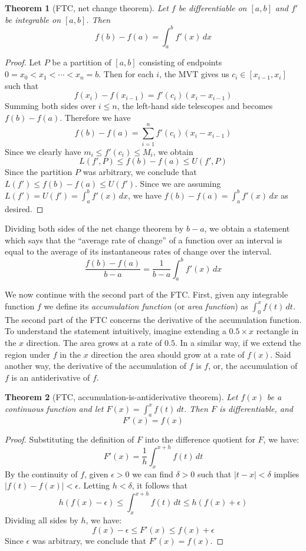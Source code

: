 \documentclass[11pt,oneside]{amsbook}
\theoremstyle{definition}
\theoremstyle{plain}
\newtheorem{theorem}{Theorem}[section]
\theoremstyle{definition}
\theoremstyle{remark}
\numberwithin{equation}{section}
\numberwithin{figure}{section}
\begin{document}
\begin{theorem}[FTC, net change theorem]
  Let $f$ be differentiable on $[a,b]$ and $f'$ be integrable on $[a,b]$. Then
  \[f(b)-f(a)=\int_a^b f'(x)\,dx
  \]
\end{theorem}

\begin{proof}
  Let $P$ be a partition of $[a,b]$ consisting of endpoints $0=x_0<x_1<\cdots<x_n=b$. Then for each $i$, the MVT gives us $c_i\in[x_{i-1},x_i]$ such that
  \[f(x_i)-f(x_{i-1})=f'(c_i)(x_i-x_{i-1})
  \]
  Summing both sides over $i\leq n$, the left-hand side telescopes and becomes $f(b)-f(a)$. Therefore we have
  \[f(b)-f(a)=\sum_{i=1}^n f'(c_i)(x_i-x_{i-1})
  \]
  Since we clearly have $m_i\leq f'(c_i)\leq M_i$, we obtain
  \[L(f',P)\leq f(b)-f(a)\leq U(f',P)
  \]
  Since the partition $P$ was arbitrary, we conclude that $L(f')\leq f(b)-f(a)\leq U(f')$. Since we are assuming $L(f')=U(f')=\int_a^bf'(x)\,dx$, we have $f(b)-f(a)=\int_a^bf'(x)\,dx$ as desired.
\end{proof}

Dividing both sides of the net change theorem by $b-a$, we obtain a statement which says that the ``average rate of change'' of a function over an interval is equal to the average of its instantaneous rates of change over the interval.
\[\frac{f(b)-f(a)}{b-a}=\frac{1}{b-a}\int_a^b f'(x)\,dx
\]

We now continue with the second part of the FTC. First, given any integrable function $f$ we define its \emph{accumulation function} (or \emph{area function}) as $\int_0^xf(t)\,dt$. The second part of the FTC concerns the derivative of the accumulation function. To understand the statement intuitively, imagine extending a $0.5\times x$ rectangle in the $x$ direction. The area grows at a rate of $0.5$. In a similar way, if we extend the region under $f$ in the $x$ direction the area should grow at a rate of $f(x)$. Said another way, the derivative of the accumulation of $f$ is $f$, or, the accumulation of $f$ is an antiderivative of $f$.

\begin{theorem}[FTC, accumulation-is-antiderivative theorem]
  Let $f(x)$ be a continuous function and let $F(x)=\int_a^x f(t)\,dt$. Then $F$ is differentiable, and
  \[F'(x)=f(x)
  \]
\end{theorem}

\begin{proof}
  Substituting the definition of $F$ into the difference quotient for $F$, we have:
  \[F'(x)=\frac{1}{h}\int_x^{x+h} f(t)\,dt
  \]
  By the continuity of $f$, given $\epsilon>0$ we can find $\delta>0$ such that $|t-x|<\delta$ implies $|f(t)-f(x)|<\epsilon$. Letting $h<\delta$, it follows that
  \[h(f(x)-\epsilon)\leq\int_x^{x+h} f(t)\,dt\leq h(f(x)+\epsilon)
  \]
  Dividing all sides by $h$, we have:
  \[f(x)-\epsilon\leq F'(x)\leq f(x)+\epsilon
  \]
  Since $\epsilon$ was arbitrary, we conclude that $F'(x)=f(x)$.
\end{proof}
\end{document}
